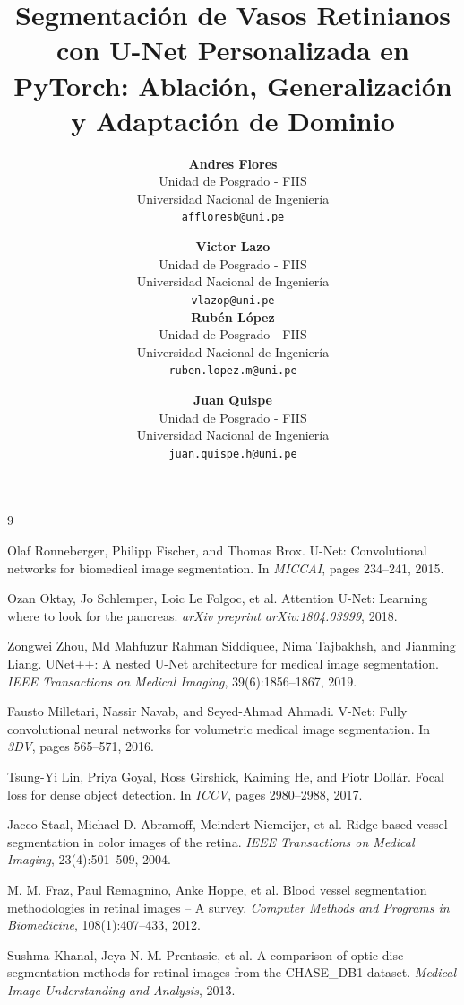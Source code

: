 \documentclass{article}
\title{Segmentación de Vasos Retinianos con U-Net Personalizada en PyTorch: Ablación, Generalización y Adaptación de Dominio}
\author{%
  \textbf{Andres Flores} \\
  Unidad de Posgrado - FIIS \\
  Universidad Nacional de Ingeniería \\
  \texttt{affloresb@uni.pe} \\
  \and
  \textbf{Victor Lazo} \\
  Unidad de Posgrado - FIIS \\
  Universidad Nacional de Ingeniería \\
  \texttt{vlazop@uni.pe} \\
  \AND
  \textbf{Rubén López} \\
  Unidad de Posgrado - FIIS \\
  Universidad Nacional de Ingeniería \\
  \texttt{ruben.lopez.m@uni.pe} \\
  \and
  \textbf{Juan Quispe} \\
  Unidad de Posgrado - FIIS \\
  Universidad Nacional de Ingeniería \\
  \texttt{juan.quispe.h@uni.pe}
}
\begin{document}
\maketitle










\begin{thebibliography}{9}

Olaf Ronneberger, Philipp Fischer, and Thomas Brox.
\newblock U-Net: Convolutional networks for biomedical image segmentation.
\newblock In \emph{MICCAI}, pages 234--241, 2015.

Ozan Oktay, Jo Schlemper, Loic Le Folgoc, et al.
\newblock Attention U-Net: Learning where to look for the pancreas.
\newblock \emph{arXiv preprint arXiv:1804.03999}, 2018.

Zongwei Zhou, Md Mahfuzur Rahman Siddiquee, Nima Tajbakhsh, and Jianming Liang.
\newblock UNet++: A nested U-Net architecture for medical image segmentation.
\newblock \emph{IEEE Transactions on Medical Imaging}, 39(6):1856--1867, 2019.

Fausto Milletari, Nassir Navab, and Seyed-Ahmad Ahmadi.
\newblock V-Net: Fully convolutional neural networks for volumetric medical image segmentation.
\newblock In \emph{3DV}, pages 565--571, 2016.

Tsung-Yi Lin, Priya Goyal, Ross Girshick, Kaiming He, and Piotr Dollár.
\newblock Focal loss for dense object detection.
\newblock In \emph{ICCV}, pages 2980--2988, 2017.

Jacco Staal, Michael D. Abramoff, Meindert Niemeijer, et al.
\newblock Ridge-based vessel segmentation in color images of the retina.
\newblock \emph{IEEE Transactions on Medical Imaging}, 23(4):501--509, 2004.

M. M. Fraz, Paul Remagnino, Anke Hoppe, et al.
\newblock Blood vessel segmentation methodologies in retinal images -- A survey.
\newblock \emph{Computer Methods and Programs in Biomedicine}, 108(1):407--433, 2012.

Sushma Khanal, Jeya N. M. Prentasic, et al.
\newblock A comparison of optic disc segmentation methods for retinal images from the CHASE\_DB1 dataset.
\newblock \emph{Medical Image Understanding and Analysis}, 2013.

\end{thebibliography}
\end{document}

